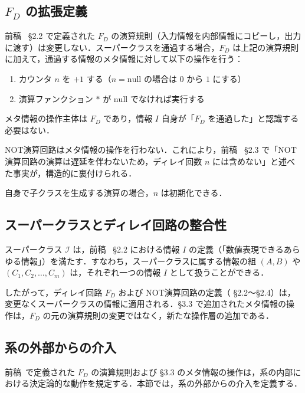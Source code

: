 \documentclass[12pt,a4paper]{ltjsarticle}
\begin{document}
\subsection{$F_D$ の拡張定義}

前稿~\cite{ref1} \S 2.2 で定義された $F_D$ の演算規則（入力情報を内部情報にコピーし，出力に渡す）は変更しない．スーパークラスを通過する場合，$F_D$ は上記の演算規則に加えて，通過する情報のメタ情報に対して以下の操作を行う：

\begin{enumerate}
  \item カウンタ $n$ を $+1$ する（$n = \mathrm{null}$ の場合は $0$ から $1$ にする）
  \item 演算ファンクション $*$ が $\mathrm{null}$ でなければ実行する
\end{enumerate}

メタ情報の操作主体は $F_D$ であり，情報 $I$ 自身が「$F_D$ を通過した」と認識する必要はない．

NOT演算回路はメタ情報の操作を行わない．これにより，前稿~\cite{ref1} \S 2.3 で「NOT演算回路の演算は遅延を伴わないため，ディレイ回数 $n$ には含めない」と述べた事実が，構造的に裏付けられる．

自身で子クラスを生成する演算の場合，$n$ は初期化できる．

\subsection{スーパークラスとディレイ回路の整合性}

スーパークラス $\mathcal{I}$ は，前稿~\cite{ref1} \S 2.2 における情報 $I$ の定義（「数値表現できるあらゆる情報」）を満たす．すなわち，スーパークラスに属する情報の組 $(A, B)$ や $(C_1, C_2, \ldots, C_m)$ は，それぞれ一つの情報 $I$ として扱うことができる．

したがって，ディレイ回路 $F_D$ および NOT演算回路の定義（\cite{ref1} \S 2.2〜\S 2.4）は，変更なくスーパークラスの情報に適用される．\S 3.3 で追加されたメタ情報の操作は，$F_D$ の元の演算規則の変更ではなく，新たな操作層の追加である．

\subsection{系の外部からの介入}

前稿~\cite{ref1}で定義された $F_D$ の演算規則および \S 3.3 のメタ情報の操作は，系の内部における決定論的な動作を規定する．本節では，系の外部からの介入を定義する．
\end{document}
